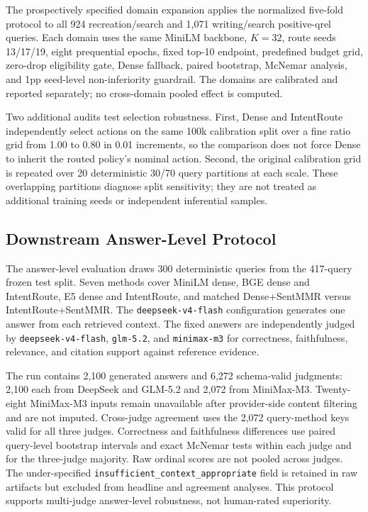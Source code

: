 The prospectively specified domain expansion applies the normalized five-fold protocol to all 924 recreation/search and 1,071 writing/search positive-qrel queries. Each domain uses the same MiniLM backbone, $K=32$, route seeds 13/17/19, eight prequential epochs, fixed top-10 endpoint, predefined budget grid, zero-drop eligibility gate, Dense fallback, paired bootstrap, McNemar analysis, and 1pp seed-level non-inferiority guardrail. The domains are calibrated and reported separately; no cross-domain pooled effect is computed.

Two additional audits test selection robustness. First, Dense and IntentRoute independently select actions on the same 100k calibration split over a fine ratio grid from 1.00 to 0.80 in 0.01 increments, so the comparison does not force Dense to inherit the routed policy's nominal action. Second, the original calibration grid is repeated over 20 deterministic 30/70 query partitions at each scale. These overlapping partitions diagnose split sensitivity; they are not treated as additional training seeds or independent inferential samples.

\subsection{Downstream Answer-Level Protocol}
\label{sec:05-experimental-setup:downstream-answer-level-protocol}

The answer-level evaluation draws 300 deterministic queries from the 417-query frozen test split. Seven methods cover MiniLM dense, BGE dense and IntentRoute, E5 dense and IntentRoute, and matched Dense+SentMMR versus IntentRoute+SentMMR. The \nolinkurl{deepseek-v4-flash} configuration generates one answer from each retrieved context. The fixed answers are independently judged by \nolinkurl{deepseek-v4-flash}, \nolinkurl{glm-5.2}, and \nolinkurl{minimax-m3} for correctness, faithfulness, relevance, and citation support against reference evidence.

The run contains 2,100 generated answers and 6,272 schema-valid judgments: 2,100 each from DeepSeek and GLM-5.2 and 2,072 from MiniMax-M3. Twenty-eight MiniMax-M3 inputs remain unavailable after provider-side content filtering and are not imputed. Cross-judge agreement uses the 2,072 query-method keys valid for all three judges. Correctness and faithfulness differences use paired query-level bootstrap intervals and exact McNemar tests within each judge and for the three-judge majority. Raw ordinal scores are not pooled across judges. The under-specified \nolinkurl{insufficient_context_appropriate} field is retained in raw artifacts but excluded from headline and agreement analyses. This protocol supports multi-judge answer-level robustness, not human-rated superiority.
